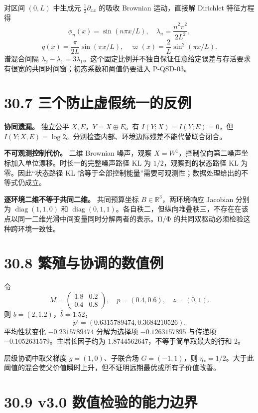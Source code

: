 \documentclass[
  11pt,
  oneside]{book}
\begin{document}
对区间 \((0,L)\) 中生成元 \(\frac12\partial_{xx}\) 的吸收 Brownian 运动，直接解 Dirichlet 特征方程得 \[\phi_n(x)=\sin(n\pi x/L),\quad
\lambda_n=\frac{n^2\pi^2}{2L^2},\] \[q(x)=\frac{\pi}{2L}\sin(\pi x/L),\quad
\varpi(x)=\frac2L\sin^2(\pi x/L).\] 谱混合间隔 \(\lambda_2-\lambda_1=3\lambda_1\)。这个固定比例并不独自保证任意给定误差与存活要求有很宽的共同时间窗；初态系数和阈值仍要进入 P-QSD-03。

\section{30.7 三个防止虚假统一的反例}\label{ux4e09ux4e2aux9632ux6b62ux865aux5047ux7edfux4e00ux7684ux53cdux4f8b}

\textbf{协同遗漏。} 独立公平 \(X,E\)，\(Y=X\oplus E\)。有 \(I(Y;X)=I(Y;E)=0\)，但 \(I(Y;X,E)=\log2\)。分别检查内部、环境边际残差不能代替联合闭合。

\textbf{不可观测控制代价。} 二维 Brownian 噪声，观察 \(X=W^1\)，控制仅向第二噪声坐标加入单位漂移。时长一的完整噪声路径 KL 为 \(1/2\)，观察到的状态路径 KL 为零。因此``状态路径 KL 恰等于全部控制能量''需要可观测性；数据处理给出的不等式仍成立。

\textbf{逐环境二维不等于共同二维。} 共同预算坐标 \(B\in\mathbb R^3\)，两环境响应 Jacobian 分别为 \(\operatorname{diag}(1,1,0)\) 和 \(\operatorname{diag}(0,1,1)\)。各自秩二，但纵向堆叠秩三，不存在在该点以同一二维光滑中间变量同时分解两者的表示。Π/Φ 的共同双驱动必须检验这种跨环境一致性。

\section{30.8 繁殖与协调的数值例}\label{ux7e41ux6b96ux4e0eux534fux8c03ux7684ux6570ux503cux4f8b}

令 \[M=\begin{pmatrix}1.8&0.2\\0.4&0.8\end{pmatrix},\quad
p=(0.4,0.6),\quad z=(0,1).\] 则 \(b=(2,1.2)\)，\(\bar b=1.52\)， \[p'=(0.6315789474,0.3684210526).\] 平均性状变化 \(-0.2315789474\) 分解为选择项 \(-0.1263157895\) 与传递项 \(-0.1052631579\)。主增长因子约为 \(1.8744562647\)，不等于简单取最大的行和 2。

层级协调中取父梯度 \(g=(1,0)\)、子联合场 \(G=(-1,1)\)，则 \(\eta_*=1/2\)。大于此阈值的混合使父价值瞬时上升，但不证明远期最优或所有子价值改善。

\section{30.9 v3.0 数值检验的能力边界}\label{v3.0-ux6570ux503cux68c0ux9a8cux7684ux80fdux529bux8fb9ux754c}
\end{document}
